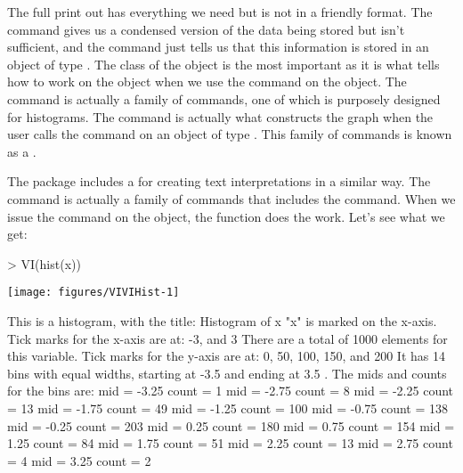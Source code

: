 The full print out has everything we need but is not in a friendly format. The  command gives us a condensed version of the data being stored but isn't sufficient, and the  command just tells us that this information is stored in an object of type . The class of the object is the most important as it is what tells \R{} how to work on the object when we use the  command on the  object. The  command is actually a family of commands, one of which is purposely designed for histograms. The  command is actually what constructs the graph when the user calls the  command on an object of type . This family of commands is known as a .

The  package includes a  for creating text interpretations in a similar way. The  command is actually a family of commands that includes the  command. When we issue the  command on the  object, the  function does the work. Let's see what we get:
\begin{Schunk}
\begin{Sinput}
> VI(hist(x))
\end{Sinput}

\texttt{[image: figures/VIVIHist-1]} \begin{Soutput}
This is a histogram, with the title: Histogram of x 
 "x" is marked on the x-axis.
Tick marks for the x-axis are at: -3, and 3 
There are a total of 1000 elements for this variable.
Tick marks for the y-axis are at: 0, 50, 100, 150, and 200 
It has 14 bins with equal widths, starting at -3.5 and ending at 3.5 .
The mids and counts for the bins are:
mid = -3.25  count = 1 
mid = -2.75  count = 8 
mid = -2.25  count = 13 
mid = -1.75  count = 49 
mid = -1.25  count = 100 
mid = -0.75  count = 138 
mid = -0.25  count = 203 
mid = 0.25  count = 180 
mid = 0.75  count = 154 
mid = 1.25  count = 84 
mid = 1.75  count = 51 
mid = 2.25  count = 13 
mid = 2.75  count = 4 
mid = 3.25  count = 2
\end{Soutput}
\end{Schunk}



